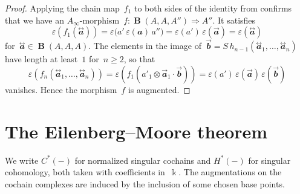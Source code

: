 \documentclass[letterpaper]{amsart}
\numberwithin{equation}{section}
\theoremstyle{plain}
\theoremstyle{definition}
\theoremstyle{remark}
\let\epsilon\varepsilon
\def\Ainf{A_{\infty}}
\DeclareMathOperator{\BB}{\mathbf{B}}
\def\kk{\Bbbk}
\def\aa{\mathbfit{a}}
\def\raa{\overset{\text{$\rightarrow$}}{\aa}}
\def\taa{\overset{\text{$\leftrightarrow$}}{\aa}}
\def\bb{\mathbfit{b}}
\def\rbb{\overset{\text{$\rightarrow$}}{\bb}}
\def\ff{f_{1}}
\begin{document}
\begin{proof}
  Applying the chain map~$\ff$ to both sides of the identity from  confirms that we have
  an $\Ainf$-morphism~$f\colon \BB(A,A,A'')\Rightarrow A''$. It satisfies
  \begin{equation}
    \epsilon(f_{1}(\taa)) = \epsilon\bigl(a'\,\epsilon(\aa)\,a''\bigr) = \epsilon(a')\,\epsilon(\raa) = \epsilon(\taa)
  \end{equation}
  for~$\taa\in \BB(A,A,A)$. The elements in the image of~$\rbb = S\,h_{n-1}(\taa_{1},\dots,\taa_{n})$
  have length at least~$1$ for~$n\ge2$, so that
  \begin{equation}
    \epsilon(f_{n}(\taa_{1},\dots,\taa_{n})) = \epsilon(\ff(a'_{1}\otimes\raa_{1}\cdot \rbb)) = \epsilon(a')\,\epsilon(\raa)\,\epsilon(\rbb)
  \end{equation}
  vanishes. Hence the morphism~$f$ is augmented.  
\end{proof}



\section{The Eilenberg--Moore theorem}
\label{sec:e-m}

We write $C^{*}(-)$ for normalized singular cochains and $H^{*}(-)$ for singular cohomology,
both taken with coefficients in~$\kk$. The augmentations on the cochain complexes are induced
by the inclusion of some chosen base points.
\end{document}
